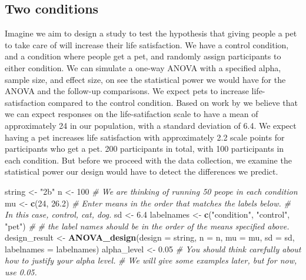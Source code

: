 \documentclass[
]{book}
\newenvironment{Shaded}{\begin{snugshade}}{\end{snugshade}}
\newcommand{\CommentTok}[1]{\textcolor[rgb]{0.56,0.35,0.01}{\textit{#1}}}
\newcommand{\DataTypeTok}[1]{\textcolor[rgb]{0.13,0.29,0.53}{#1}}
\newcommand{\DecValTok}[1]{\textcolor[rgb]{0.00,0.00,0.81}{#1}}
\newcommand{\FloatTok}[1]{\textcolor[rgb]{0.00,0.00,0.81}{#1}}
\newcommand{\KeywordTok}[1]{\textcolor[rgb]{0.13,0.29,0.53}{\textbf{#1}}}
\newcommand{\NormalTok}[1]{#1}
\newcommand{\StringTok}[1]{\textcolor[rgb]{0.31,0.60,0.02}{#1}}
\begin{document}
\hypertarget{two-conditions}{%
\subsection{Two conditions}\label{two-conditions}}

Imagine we aim to design a study to test the hypothesis that giving people a pet to take care of will increase their life satisfaction. We have a control condition, and a condition where people get a pet, and randomly assign participants to either condition. We can simulate a one-way ANOVA with a specified alpha, sample size, and effect size, on see the statistical power we would have for the ANOVA and the follow-up comparisons. We expect pets to increase life-satisfaction compared to the control condition. Based on work by \citet{pavot1993affective} we believe that we can expect responses on the life-satifaction scale to have a mean of approximately 24 in our population, with a standard deviation of 6.4. We expect having a pet increases life satisfaction with approximately 2.2 scale points for participants who get a pet. 200 participants in total, with 100 participants in each condition. But before we proceed with the data collection, we examine the statistical power our design would have to detect the differences we predict.

\begin{Shaded}
\begin{Highlighting}[]
\NormalTok{string <-}\StringTok{ "2b"}
\NormalTok{n <-}\StringTok{ }\DecValTok{100}
\CommentTok{# We are thinking of running 50 peope in each condition}
\NormalTok{mu <-}\StringTok{ }\KeywordTok{c}\NormalTok{(}\DecValTok{24}\NormalTok{, }\FloatTok{26.2}\NormalTok{)}
\CommentTok{# Enter means in the order that matches the labels below.}
\CommentTok{# In this case, control, cat, dog. }
\NormalTok{sd <-}\StringTok{ }\FloatTok{6.4}
\NormalTok{labelnames <-}\StringTok{ }\KeywordTok{c}\NormalTok{(}\StringTok{"condition"}\NormalTok{, }\StringTok{"control"}\NormalTok{, }\StringTok{"pet"}\NormalTok{) }\CommentTok{#}
\CommentTok{# the label names should be in the order of the means specified above.}
\NormalTok{design_result <-}\StringTok{ }\KeywordTok{ANOVA_design}\NormalTok{(}\DataTypeTok{design =}\NormalTok{ string,}
                   \DataTypeTok{n =}\NormalTok{ n, }
                   \DataTypeTok{mu =}\NormalTok{ mu, }
                   \DataTypeTok{sd =}\NormalTok{ sd, }
                   \DataTypeTok{labelnames =}\NormalTok{ labelnames)}
\NormalTok{alpha_level <-}\StringTok{ }\FloatTok{0.05}
\CommentTok{# You should think carefully about how to justify your alpha level.}
\CommentTok{# We will give some examples later, but for now, use 0.05.}
\end{Highlighting}
\end{Shaded}
\end{document}
